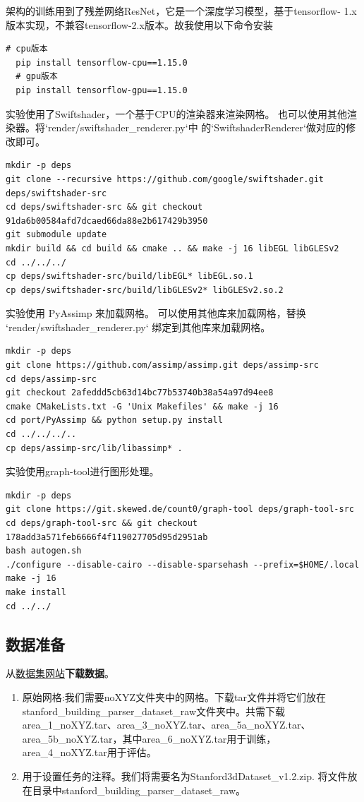 \documentclass{thuemp}
\begin{document}
架构的训练用到了残差网络ResNet，它是一个深度学习模型，基于tensorflow-
1.x版本实现，不兼容tensorflow-2.x版本。故我使用以下命令安装
\begin{lstlisting}[style = Python]
  # cpu版本
  pip install tensorflow-cpu==1.15.0
  # gpu版本
  pip install tensorflow-gpu==1.15.0
\end{lstlisting}

实验使用了Swiftshader，一个基于CPU的渲染器来渲染网格。 
也可以使用其他渲染器。将`render/swiftshader\_renderer.py`中
的`SwiftshaderRenderer`做对应的修改即可。
\begin{lstlisting}[style = Python]
mkdir -p deps
git clone --recursive https://github.com/google/swiftshader.git deps/swiftshader-src
cd deps/swiftshader-src && git checkout 91da6b00584afd7dcaed66da88e2b617429b3950
git submodule update
mkdir build && cd build && cmake .. && make -j 16 libEGL libGLESv2
cd ../../../
cp deps/swiftshader-src/build/libEGL* libEGL.so.1
cp deps/swiftshader-src/build/libGLESv2* libGLESv2.so.2
\end{lstlisting}

实验使用 PyAssimp 来加载网格。 可以使用其他库来加载网格，替换
`render/swiftshader\_renderer.py` 绑定到其他库来加载网格。
\begin{lstlisting}[style = Python]
mkdir -p deps
git clone https://github.com/assimp/assimp.git deps/assimp-src
cd deps/assimp-src
git checkout 2afeddd5cb63d14bc77b53740b38a54a97d94ee8
cmake CMakeLists.txt -G 'Unix Makefiles' && make -j 16
cd port/PyAssimp && python setup.py install
cd ../../../..
cp deps/assimp-src/lib/libassimp* .
\end{lstlisting}

实验使用graph-tool进行图形处理。
\begin{lstlisting}[style = Python]
mkdir -p deps
git clone https://git.skewed.de/count0/graph-tool deps/graph-tool-src
cd deps/graph-tool-src && git checkout 178add3a571feb6666f4f119027705d95d2951ab
bash autogen.sh
./configure --disable-cairo --disable-sparsehash --prefix=$HOME/.local
make -j 16
make install
cd ../../
\end{lstlisting}
\subsection{数据准备}
从\href{http://buildingparser.stanford.edu/dataset.html}{数据集网站}\textbf{下载数据}。
\begin{enumerate}
  \item 原始网格:我们需要noXYZ文件夹中的网格。下载tar文件并将它们放在stanford\_building\_parser\_dataset\_raw文件夹中。共需下载 area\_1\_noXYZ.tar、area\_3\_noXYZ.tar、area\_5a\_noXYZ.tar、 area\_5b\_noXYZ.tar，其中area\_6\_noXYZ.tar用于训练， area\_4\_noXYZ.tar用于评估。
  \item 用于设置任务的注释。我们将需要名为Stanford3dDataset\_v1.2.zip. 将文件放在目录中stanford\_building\_parser\_dataset\_raw。
\end{enumerate}
\end{document}
